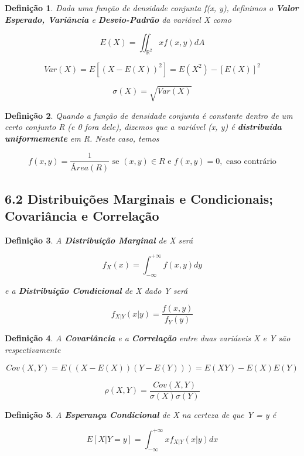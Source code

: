 \documentclass[12pt]{article}
\newtheorem{definition}{Definição}
\begin{document}
\begin{definition}
    Dada uma função de densidade conjunta f(x, y), definimos o \textbf{Valor Esperado, Variância} e \textbf{Desvio-Padrão} da variável X como
    
    $$E(X) = \iint_{\mathbb{R}^2} x f(x, y) dA$$
    
    $$Var(X) = E \left [ (X - E(X))^2 \right ] = E(X^2) - [E(X)]^2$$
    
    $$\sigma(X) = \sqrt{Var(X)}$$
\end{definition}

\begin{definition}
    Quando a função de densidade conjunta é constante dentro de um certo conjunto R (e 0 fora dele), dizemos que a variável (x, y) é \textbf{distribuída uniformemente} em R. Neste caso, temos
    
    $$f(x, y) = \frac{1}{Área(R)} \text{ se } (x, y) \in R \text{ e } f(x, y) = 0, \text{ caso contrário}$$
\end{definition}

\subsection*{6.2 Distribuições Marginais e Condicionais; Covariância e Correlação}

\begin{definition}
    A \textbf{Distribuição Marginal} de X será
    
    $$f_X(x) = \int_{- \infty}^{+ \infty} f(x, y) d y$$
    
    e a \textbf{Distribuição Condicional} de X dado Y será
    
    $$f_{X | Y} (x | y) = \dfrac{f(x, y)}{f_Y(y)}$$
\end{definition}

\begin{definition}
    A \textbf{Covariância} e a \textbf{Correlação} entre duas variáveis X e Y são respectivamente 
    
    $$Cov(X, Y) = E((X - E(X))(Y - E(Y))) = E(XY) - E(X) E(Y)$$
    
    $$\rho(X, Y) = \dfrac{Cov(X, Y)}{\sigma(X) \sigma(Y)}$$
\end{definition}

\begin{definition}
    A \textbf{Esperança Condicional} de X na certeza de que Y = y é 
    
    $$E[X | Y = y] = \int_{- \infty}^{+ \infty} x f_{X | Y} (x | y) dx$$
\end{definition}
\end{document}
